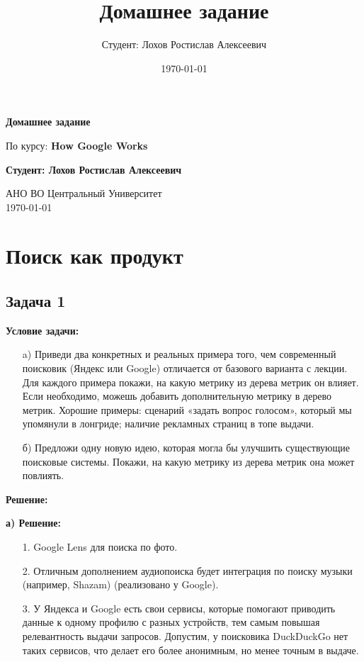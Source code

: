 \documentclass[a4paper,12pt]{article}
\title{Домашнее задание}
\author{Студент: Лохов Ростислав Алексеевич}
\date{\today}
\begin{document}
\begin{titlepage}
    \centering
    \vspace*{1cm}

    \Huge
    \textbf{Домашнее задание}

    \vspace{0.5cm}
    \LARGE
    По курсу: \textbf{How Google Works}

    \vspace{1.5cm}

    \textbf{Студент: Лохов Ростислав Алексеевич}

    \vfill

    \Large
    АНО ВО Центральный Университет\\
    \vspace{0.3cm}
    \today

\end{titlepage}

\tableofcontents
\newpage

\section{Поиск как продукт}

\subsection{Задача 1}
\textbf{Условие задачи:}
\begin{itemize}
    \item[a)] Приведи два конкретных и реальных примера того, чем современный поисковик (Яндекс или Google) отличается от базового варианта с лекции. Для каждого примера покажи, на какую метрику из дерева метрик он влияет. Если необходимо, можешь добавить дополнительную метрику в дерево метрик. Хорошие примеры: сценарий «задать вопрос голосом», который мы упомянули в лонгриде; наличие рекламных страниц в топе выдачи.
    \item[б)] Предложи одну новую идею, которая могла бы улучшить существующие поисковые системы. Покажи, на какую метрику из дерева метрик она может повлиять.
\end{itemize}

\textbf{Решение:}

\textbf{а) Решение:}
\begin{itemize}
    \item[1.] Google Lens для поиска по фото.
    \item[2.] Отличным дополнением аудиопоиска будет интеграция по поиску музыки (например, Shazam) (реализовано у Google).
    \item[3.] У Яндекса и Google есть свои сервисы, которые помогают приводить данные к одному профилю с разных устройств, тем самым повышая релевантность выдачи запросов. Допустим, у поисковика DuckDuckGo нет таких сервисов, что делает его более анонимным, но менее точным в выдаче.
\end{itemize}
\end{document}
